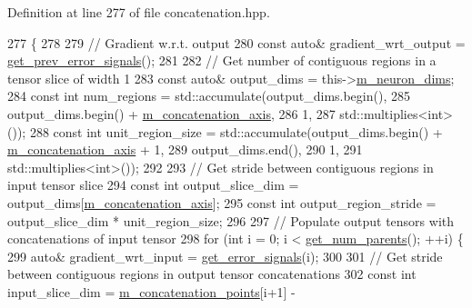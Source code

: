 Definition at line 277 of file concatenation.\+hpp.


\begin{DoxyCode}
277                         \{
278 
279     \textcolor{comment}{// Gradient w.r.t. output}
280     \textcolor{keyword}{const} \textcolor{keyword}{auto}& gradient\_wrt\_output = \hyperlink{classlbann_1_1Layer_a7ac4579d3c1671dfaf86e3b618d6938a}{get\_prev\_error\_signals}();
281 
282     \textcolor{comment}{// Get number of contiguous regions in a tensor slice of width 1}
283     \textcolor{keyword}{const} \textcolor{keyword}{auto}& output\_dims = this->\hyperlink{classlbann_1_1Layer_abb34bb8031f57a483e2e327a5f229f48}{m\_neuron\_dims};
284     \textcolor{keyword}{const} \textcolor{keywordtype}{int} num\_regions = std::accumulate(output\_dims.begin(),
285                                             output\_dims.begin() + 
      \hyperlink{classlbann_1_1concatenation__layer_a4ac4a931dc85d622e9ea8fddb9625d38}{m\_concatenation\_axis},
286                                             1,
287                                             std::multiplies<int>());
288     \textcolor{keyword}{const} \textcolor{keywordtype}{int} unit\_region\_size = std::accumulate(output\_dims.begin() + 
      \hyperlink{classlbann_1_1concatenation__layer_a4ac4a931dc85d622e9ea8fddb9625d38}{m\_concatenation\_axis} + 1,
289                                                  output\_dims.end(),
290                                                  1,
291                                                  std::multiplies<int>());
292 
293     \textcolor{comment}{// Get stride between contiguous regions in input tensor slice}
294     \textcolor{keyword}{const} \textcolor{keywordtype}{int} output\_slice\_dim = output\_dims[\hyperlink{classlbann_1_1concatenation__layer_a4ac4a931dc85d622e9ea8fddb9625d38}{m\_concatenation\_axis}];
295     \textcolor{keyword}{const} \textcolor{keywordtype}{int} output\_region\_stride = output\_slice\_dim * unit\_region\_size;
296     
297     \textcolor{comment}{// Populate output tensors with concatenations of input tensor}
298     \textcolor{keywordflow}{for} (\textcolor{keywordtype}{int} i = 0; i < \hyperlink{classlbann_1_1Layer_ac9290d4a6453ccda5f6b4d8b57b49ba3}{get\_num\_parents}(); ++i) \{
299       \textcolor{keyword}{auto}& gradient\_wrt\_input = \hyperlink{classlbann_1_1Layer_adb561e140e0bb601f3c5a8ee053a71d2}{get\_error\_signals}(i);
300 
301       \textcolor{comment}{// Get stride between contiguous regions in output tensor concatenations}
302       \textcolor{keyword}{const} \textcolor{keywordtype}{int} input\_slice\_dim = \hyperlink{classlbann_1_1concatenation__layer_a363324fe6cd104740334f3396085328c}{m\_concatenation\_points}[i+1] - 

\end{DoxyCode}
